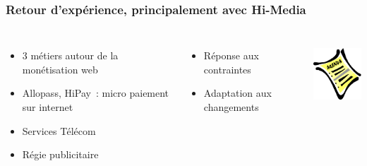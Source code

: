 \documentclass[english]{beamer}
\begin{document}
\begin{frame}[fragile]
  \frametitle{Retour d'expérience, principalement avec Hi-Media}


\begin{columns}[c]

  \begin{itemize}
   \item<1-> 3 métiers autour de la monétisation web
   \item<2-> Allopass, HiPay : micro paiement sur internet
   \item<2-> Services Télécom
   \item<2-> Régie publicitaire
  \end{itemize}  


  \begin{itemize}
  \item<4-> Réponse aux contraintes
  \item<4-> Adaptation aux changements
  \end{itemize}  

\begin{center}
  \includegraphics[height=7em]{agenda.jpg}
\end{center}
\end{columns}
\end{frame}
\end{document}
